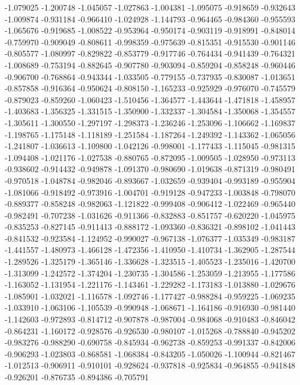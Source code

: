 -1.079025
-1.200748
-1.045057
-1.027863
-1.004381
-1.095075
-0.918659
-0.932643
-1.009874
-0.931184
-0.966410
-1.024928
-1.144793
-0.964465
-0.984360
-0.955593
-1.065676
-0.919685
-1.008522
-0.953964
-0.950174
-0.903119
-0.918991
-0.848014
-0.759970
-0.909049
-0.808611
-0.998359
-0.975639
-0.815351
-0.915530
-0.901146
-0.805577
-1.080997
-0.829822
-0.853779
-0.917746
-0.764434
-0.941439
-0.764321
-1.008689
-0.753194
-0.882645
-0.907780
-0.903094
-0.859204
-0.858248
-0.960446
-0.906700
-0.768864
-0.943344
-1.033505
-0.779155
-0.737935
-0.830087
-1.013651
-0.857858
-0.916364
-0.950624
-0.808150
-1.165233
-0.925929
-0.976070
-0.745579
-0.879023
-0.859260
-1.060423
-1.510456
-1.364577
-1.443644
-1.471818
-1.458957
-1.403683
-1.356325
-1.331515
-1.350900
-1.332337
-1.304584
-1.350068
-1.354557
-1.305611
-1.300550
-1.297197
-1.298373
-1.236246
-1.253096
-1.106662
-1.169837
-1.198765
-1.175148
-1.118189
-1.251584
-1.187264
-1.249392
-1.143362
-1.065056
-1.241807
-1.036613
-1.109800
-1.042126
-0.998001
-1.177433
-1.115045
-0.981315
-1.094408
-1.021176
-1.027538
-0.880765
-0.872095
-1.009505
-1.028950
-0.973113
-0.938602
-0.914432
-0.949878
-1.091370
-0.980690
-1.019638
-0.871319
-0.980491
-0.970518
-1.048784
-0.982046
-0.893667
-1.032659
-0.939404
-0.993189
-0.955904
-1.081066
-0.918492
-0.973916
-1.004701
-0.919128
-0.947233
-1.003848
-0.798070
-0.889377
-0.858248
-0.982063
-1.121822
-0.999408
-0.906412
-1.022469
-0.965440
-0.982491
-0.707238
-1.031626
-0.911366
-0.832883
-0.851757
-0.620220
-1.045975
-0.835253
-0.827145
-0.911413
-0.888172
-1.093360
-0.836321
-0.898102
-1.041443
-0.841532
-0.923584
-1.124952
-0.990027
-0.967138
-1.076377
-1.035349
-0.983187
-1.441557
-1.480973
-1.466128
-1.472356
-1.410950
-1.410734
-1.362905
-1.287544
-1.289526
-1.325179
-1.365146
-1.336628
-1.323515
-1.405523
-1.235016
-1.420700
-1.313099
-1.242572
-1.374204
-1.230735
-1.304586
-1.253059
-1.213955
-1.177586
-1.163052
-1.131954
-1.221176
-1.143461
-1.229282
-1.173183
-1.013880
-1.029676
-1.085901
-1.032021
-1.116578
-1.092746
-1.177427
-0.988284
-0.959225
-1.069235
-1.033910
-1.063106
-1.105539
-0.990948
-1.068671
-1.164186
-0.916930
-0.981440
-1.142603
-0.972893
-0.814712
-0.907878
-0.987004
-0.984068
-0.910483
-0.846042
-0.864231
-1.160172
-0.928576
-0.926530
-0.980107
-1.015268
-0.788840
-0.945202
-0.983276
-0.988290
-0.690758
-0.845934
-0.962738
-0.859253
-0.991337
-0.842006
-0.906293
-1.023803
-0.868581
-1.068384
-0.843205
-1.050026
-1.100944
-0.821467
-1.012513
-0.906911
-0.910101
-0.928624
-0.937818
-0.925834
-0.964855
-0.941848
-0.926201
-0.876735
-0.894386
-0.705791
